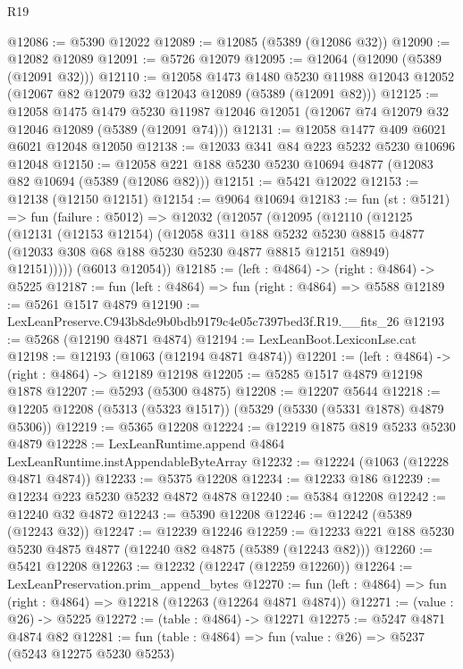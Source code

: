 \begin{lexlean}{R19}
\begin{coremodule}
@12086 := @5390 @12022
@12089 := @12085 (@5389 (@12086 @32))
@12090 := @12082 @12089
@12091 := @5726 @12079
@12095 := @12064 (@12090 (@5389 (@12091 @32)))
@12110 := @12058
    @1473
    @1480
    @5230
    @11988
    @12043
    @12052
    (@12067 @82 @12079 @32 @12043 @12089 (@5389 (@12091 @82)))
@12125 := @12058
    @1475
    @1479
    @5230
    @11987
    @12046
    @12051
    (@12067 @74 @12079 @32 @12046 @12089 (@5389 (@12091 @74)))
@12131 := @12058 @1477 @409 @6021 @6021 @12048 @12050
@12138 := @12033 @341 @84 @223 @5232 @5230 @10696 @12048
@12150 := @12058 @221 @188 @5230 @5230 @10694 @4877 (@12083 @82 @10694 (@5389 (@12086 @82)))
@12151 := @5421 @12022
@12153 := @12138 (@12150 @12151)
@12154 := @9064 @10694
@12183 := fun (st : @5121) =>
  fun (failure : @5012) =>
  @12032
    (@12057
      (@12095
        (@12110
          (@12125
            (@12131
              (@12153 @12154)
              (@12058
                @311
                @188
                @5232
                @5230
                @8815
                @4877
                (@12033 @308 @68 @188 @5230 @5230 @4877 @8815 @12151 @8949)
                @12151)))))
      (@6013 @12054))
@12185 := (left : @4864) -> (right : @4864) -> @5225
@12187 := fun (left : @4864) => fun (right : @4864) => @5588
@12189 := @5261 @1517 @4879
@12190 := LexLeanPreserve.C943b8de9b0bdb9179c4e05c7397bed3f.R19.__fits_26
@12193 := @5268 (@12190 @4871 @4874)
@12194 := LexLeanBoot.LexiconLse.cat
@12198 := @12193 (@1063 (@12194 @4871 @4874))
@12201 := (left : @4864) -> (right : @4864) -> @12189 @12198
@12205 := @5285 @1517 @4879 @12198 @1878
@12207 := @5293 (@5300 @4875)
@12208 := @12207 @5644
@12218 := @12205 @12208 (@5313 (@5323 @1517)) (@5329 (@5330 (@5331 @1878) @4879 @5306))
@12219 := @5365 @12208
@12224 := @12219 @1875 @819 @5233 @5230 @4879
@12228 := LexLeanRuntime.append @4864 LexLeanRuntime.instAppendableByteArray
@12232 := @12224 (@1063 (@12228 @4871 @4874))
@12233 := @5375 @12208
@12234 := @12233 @186
@12239 := @12234 @223 @5230 @5232 @4872 @4878
@12240 := @5384 @12208
@12242 := @12240 @32 @4872
@12243 := @5390 @12208
@12246 := @12242 (@5389 (@12243 @32))
@12247 := @12239 @12246
@12259 := @12233 @221 @188 @5230 @5230 @4875 @4877 (@12240 @82 @4875 (@5389 (@12243 @82)))
@12260 := @5421 @12208
@12263 := @12232 (@12247 (@12259 @12260))
@12264 := LexLeanPreservation.prim_append_bytes
@12270 := fun (left : @4864) => fun (right : @4864) => @12218 (@12263 (@12264 @4871 @4874))
@12271 := (value : @26) -> @5225
@12272 := (table : @4864) -> @12271
@12275 := @5247 @4871 @4874 @82
@12281 := fun (table : @4864) => fun (value : @26) => @5237 (@5243 @12275 @5230 @5253)

\end{coremodule}
\end{lexlean}

